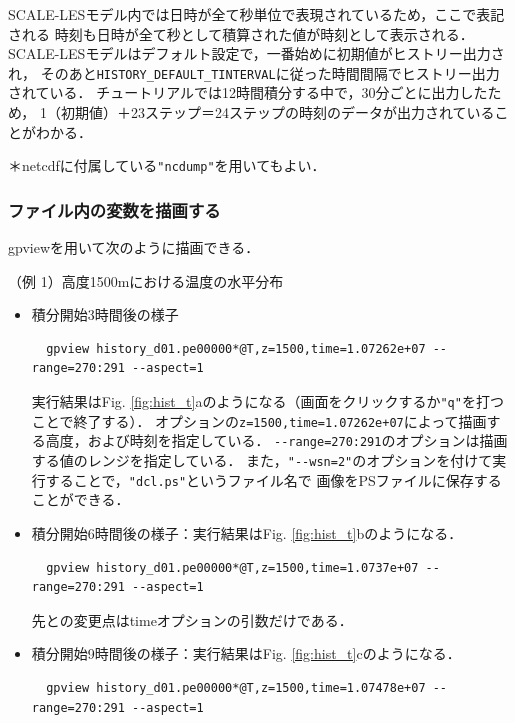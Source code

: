 SCALE-LESモデル内では日時が全て秒単位で表現されているため，ここで表記される
時刻も日時が全て秒として積算された値が時刻として表示される．
SCALE-LESモデルはデフォルト設定で，一番始めに初期値がヒストリー出力され，
そのあと\verb|HISTORY_DEFAULT_TINTERVAL|に従った時間間隔でヒストリー出力されている．
チュートリアルでは12時間積分する中で，30分ごとに出力したため，
1（初期値）＋23ステップ＝24ステップの時刻のデータが出力されていることがわかる．


{\small ＊netcdfに付属している\verb|"ncdump"|を用いてもよい．}


\subsubsection{ファイル内の変数を描画する}

gpviewを用いて次のように描画できる．

（例 1）高度1500mにおける温度の水平分布
\begin{itemize}

\item 積分開始3時間後の様子
  \begin{verbatim}
  gpview history_d01.pe00000*@T,z=1500,time=1.07262e+07 --range=270:291 --aspect=1
  \end{verbatim}
  実行結果はFig. \ref{fig:hist_t}aのようになる（画面をクリックするか\verb|"q"|を打つことで終了する）．
  オプションの\verb|z=1500,time=1.07262e+07|によって描画する高度，および時刻を指定している．
  \verb|--range=270:291|のオプションは描画する値のレンジを指定している．
  また，\verb|"--wsn=2"|のオプションを付けて実行することで，\verb|"dcl.ps"|というファイル名で
  画像をPSファイルに保存することができる．

\item 積分開始6時間後の様子：実行結果はFig. \ref{fig:hist_t}bのようになる．
  \begin{verbatim}
  gpview history_d01.pe00000*@T,z=1500,time=1.0737e+07 --range=270:291 --aspect=1
  \end{verbatim}
  先との変更点はtimeオプションの引数だけである．

\item 積分開始9時間後の様子：実行結果はFig. \ref{fig:hist_t}cのようになる．
  \begin{verbatim}
  gpview history_d01.pe00000*@T,z=1500,time=1.07478e+07 --range=270:291 --aspect=1
  \end{verbatim}

\end{itemize}


